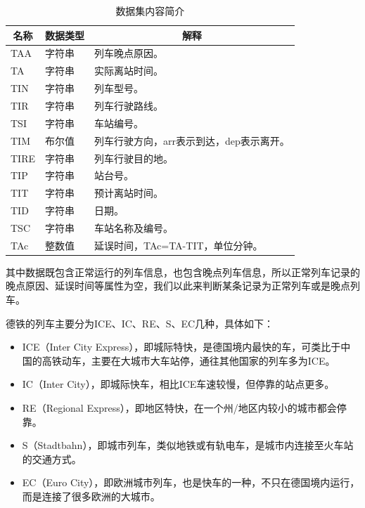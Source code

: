 \documentclass[lang=cn,12pt,a4paper,cite=authoryear]{elegantpaper}
\begin{document}
\begin{table}[H]
	\centering
	\caption{数据集内容简介}
	\label{tab1}
	\begin{tabular}{lll}
		\hline
		\multicolumn{1}{c}{名称} & \multicolumn{1}{c}{数据类型} & \multicolumn{1}{c}{解释}  \\ \hline
		TAA                    & 字符串                      & 列车晚点原因。                 \\
		TA                     & 字符串                      & 实际离站时间。                 \\
		TIN                    & 字符串                      & 列车型号。                   \\
		TIR                    & 字符串                      & 列车行驶路线。                 \\
		TSI                    & 字符串                      & 车站编号。                   \\
		TIM                    & 布尔值                      & 列车行驶方向，arr表示到达，dep表示离开。 \\
		TIRE                   & 字符串                      & 列车行驶目的地。                \\
		TIP                    & 字符串                      & 站台号。                    \\
		TIT                    & 字符串                      & 预计离站时间。                 \\
		TID                    & 字符串                      & 日期。                     \\
		TSC                    & 字符串                      & 车站名称及编号。                \\
		TAc                    & 整数值                      & 延误时间，TAc=TA-TIT，单位分钟。   \\ \hline
	\end{tabular}
\end{table}

其中数据既包含正常运行的列车信息，也包含晚点列车信息，所以正常列车记录的晚点原因、延误时间等属性为空，我们以此来判断某条记录为正常列车或是晚点列车。

德铁的列车主要分为ICE、IC、RE、S、EC几种，具体如下：
\begin{itemize}
	\item ICE（Inter City Express），即城际特快，是德国境内最快的车，可类比于中国的高铁动车，主要在大城市大车站停，通往其他国家的列车多为ICE。
	\item IC（Inter City），即城际快车，相比ICE车速较慢，但停靠的站点更多。
	\item RE（Regional Express），即地区特快，在一个州/地区内较小的城市都会停靠。
	\item S（Stadtbahn），即城市列车，类似地铁或有轨电车，是城市内连接至火车站的交通方式。
	\item EC（Euro City），即欧洲城市列车，也是快车的一种，不只在德国境内运行，而是连接了很多欧洲的大城市。
\end{itemize}
\end{document}
